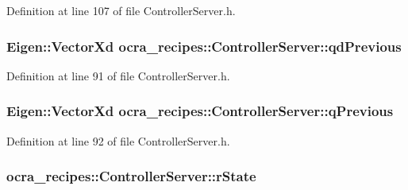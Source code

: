 Definition at line 107 of file Controller\+Server.\+h.

\subsubsection[{\texorpdfstring{qd\+Previous}{qdPrevious}}]{\setlength{\rightskip}{0pt plus 5cm}Eigen\+::\+Vector\+Xd ocra\+\_\+recipes\+::\+Controller\+Server\+::qd\+Previous\hspace{0.3cm}{\ttfamily [protected]}}\hypertarget{classocra__recipes_1_1ControllerServer_a0c8aeaa64fd882b0365731d61c68c931}{}\label{classocra__recipes_1_1ControllerServer_a0c8aeaa64fd882b0365731d61c68c931}


Definition at line 91 of file Controller\+Server.\+h.

\subsubsection[{\texorpdfstring{q\+Previous}{qPrevious}}]{\setlength{\rightskip}{0pt plus 5cm}Eigen\+::\+Vector\+Xd ocra\+\_\+recipes\+::\+Controller\+Server\+::q\+Previous\hspace{0.3cm}{\ttfamily [protected]}}\hypertarget{classocra__recipes_1_1ControllerServer_aaba8c18a9f9e98ad54486012ef476ad1}{}\label{classocra__recipes_1_1ControllerServer_aaba8c18a9f9e98ad54486012ef476ad1}


Definition at line 92 of file Controller\+Server.\+h.

\subsubsection[{\texorpdfstring{r\+State}{rState}}]{ ocra\+\_\+recipes\+::\+Controller\+Server\+::r\+State\hspace{0.3cm}{\ttfamily [protected]}}\hypertarget{classocra__recipes_1_1ControllerServer_a5c565a9ec45e5fad7b56e9a48609ef3d}{}\label{classocra__recipes_1_1ControllerServer_a5c565a9ec45e5fad7b56e9a48609ef3d}


